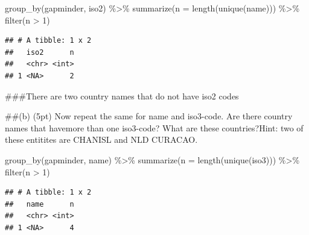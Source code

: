 \documentclass[
]{article}
\newenvironment{Shaded}{\begin{snugshade}}{\end{snugshade}}
\newcommand{\AttributeTok}[1]{\textcolor[rgb]{0.77,0.63,0.00}{#1}}
\newcommand{\DecValTok}[1]{\textcolor[rgb]{0.00,0.00,0.81}{#1}}
\newcommand{\FunctionTok}[1]{\textcolor[rgb]{0.00,0.00,0.00}{#1}}
\newcommand{\NormalTok}[1]{#1}
\newcommand{\SpecialCharTok}[1]{\textcolor[rgb]{0.00,0.00,0.00}{#1}}
\begin{document}
\begin{Shaded}
\begin{Highlighting}[]
\FunctionTok{group\_by}\NormalTok{(gapminder, iso2) }\SpecialCharTok{\%\textgreater{}\%} 
  \FunctionTok{summarize}\NormalTok{(}\AttributeTok{n =} \FunctionTok{length}\NormalTok{(}\FunctionTok{unique}\NormalTok{(name))) }\SpecialCharTok{\%\textgreater{}\%} 
  \FunctionTok{filter}\NormalTok{(n }\SpecialCharTok{\textgreater{}} \DecValTok{1}\NormalTok{)}
\end{Highlighting}
\end{Shaded}

\begin{verbatim}
## # A tibble: 1 x 2
##   iso2      n
##   <chr> <int>
## 1 <NA>      2
\end{verbatim}

\#\#\#There are two country names that do not have iso2 codes

\#\#(b) (5pt) Now repeat the same for name and iso3-code. Are there
country names that havemore than one iso3-code? What are these
countries?Hint: two of these entitites are CHANISL and NLD CURACAO.

\begin{Shaded}
\begin{Highlighting}[]
\FunctionTok{group\_by}\NormalTok{(gapminder, name) }\SpecialCharTok{\%\textgreater{}\%} 
  \FunctionTok{summarize}\NormalTok{(}\AttributeTok{n =} \FunctionTok{length}\NormalTok{(}\FunctionTok{unique}\NormalTok{(iso3))) }\SpecialCharTok{\%\textgreater{}\%} 
  \FunctionTok{filter}\NormalTok{(n }\SpecialCharTok{\textgreater{}} \DecValTok{1}\NormalTok{)}
\end{Highlighting}
\end{Shaded}

\begin{verbatim}
## # A tibble: 1 x 2
##   name      n
##   <chr> <int>
## 1 <NA>      4
\end{verbatim}

\begin{Shaded}
\end{Shaded}
\end{document}
